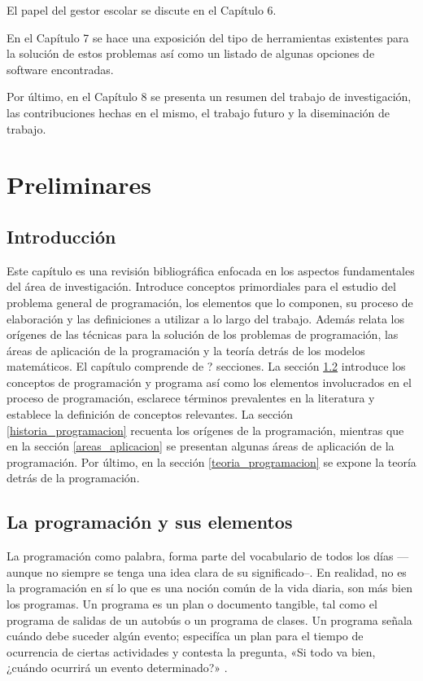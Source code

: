 \documentclass[draft,12pt,headsepline,footsepline,paper=letter]{scrreprt}
\begin{document}
El papel del gestor escolar se discute en el Capítulo 6.

En el Capítulo 7 se hace una exposición del tipo de herramientas existentes para la solución de estos problemas así como un listado de algunas opciones de software encontradas.

Por último, en el Capítulo 8 se presenta un resumen del trabajo de investigación, las contribuciones hechas en el mismo, el trabajo futuro y la diseminación de trabajo.

\chapter{Preliminares}
\label{preliminares}

\section{Introducción}
\label{introduccion_preliminares}

Este capítulo es una revisión bibliográfica enfocada en los aspectos fundamentales del área de investigación.
Introduce conceptos primordiales para el estudio del problema general de programación, los elementos que lo componen, su proceso de elaboración y las definiciones a utilizar a lo largo del trabajo. Además relata los orígenes de las técnicas para la solución de los problemas de programación, las áreas de aplicación de la programación y la teoría detrás de los modelos matemáticos.
El capítulo comprende de ? secciones. La sección \ref{programacion_elementos} introduce los conceptos de programación y programa así como los elementos involucrados en el proceso de programación, esclarece términos prevalentes en la literatura y establece la definición de conceptos relevantes. La sección \ref{historia_programacion} recuenta los orígenes de la programación, mientras que en la sección \ref{areas_aplicacion} se presentan algunas áreas de aplicación de la programación. Por último, en la sección \ref{teoria_programacion} se expone la teoría detrás de la programación.

\section{La programación y sus elementos} %
\label{programacion_elementos}

La programación como palabra, forma parte del vocabulario de todos los días —aunque no siempre se tenga una idea clara de su significado–. En realidad, no es la programación en sí lo que es una noción común de la vida diaria, son más bien los programas. Un programa es un plan o documento tangible, tal como el programa de salidas de un autobús o un programa de clases. Un programa señala cuándo debe suceder algún evento; especifíca un plan para el tiempo de ocurrencia de ciertas actividades y contesta la pregunta, «Si todo va bien, ¿cuándo ocurrirá un evento determinado?» \cite[p.~1]{Baker2009}.
\end{document}
